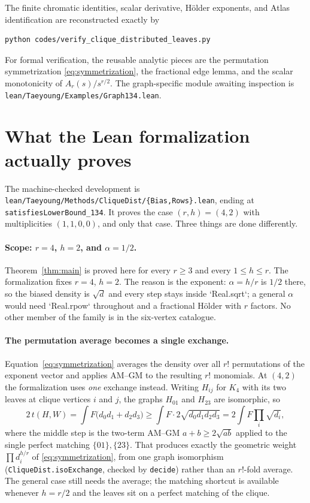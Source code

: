 \documentclass[11pt]{article}
\begin{document}
The finite chromatic identities, scalar derivative, H\"older exponents, and
Atlas identification are reconstructed exactly by
\begin{verbatim}
python codes/verify_clique_distributed_leaves.py
\end{verbatim}
For formal verification, the reusable analytic pieces are the permutation
symmetrization \eqref{eq:symmetrization}, the fractional edge lemma, and the
scalar monotonicity of $A_r(s)/s^{r/2}$.  The graph-specific module awaiting
inspection is
\texttt{lean/Taeyoung/Examples/Graph134.lean}.


\section{What the Lean formalization actually proves}

The machine-checked development is
\texttt{lean/Taeyoung/Methods/CliqueDist/\{Bias,Rows\}.lean}, ending at
\texttt{satisfiesLowerBound\_134}.  It proves the case
$(r,h)=(4,2)$ with multiplicities $(1,1,0,0)$, and only that case.  Three
things are done differently.

\paragraph{Scope: $r=4$, $h=2$, and $\alpha=1/2$.}
Theorem~\ref{thm:main} is proved here for every $r\geq3$ and every
$1\leq h\leq r$.  The formalization fixes $r=4$, $h=2$.  The reason is the
exponent: $\alpha=h/r$ is $1/2$ there, so the biased density is $\sqrt d$ and
every step stays inside `Real.sqrt`; a general $\alpha$ would need
`Real.rpow` throughout and a fractional H\"older with $r$ factors.  No other
member of the family is in the six-vertex catalogue.

\paragraph{The permutation average becomes a single exchange.}
Equation~\eqref{eq:symmetrization} averages the density over all $r!$
permutations of the exponent vector and applies AM--GM to the resulting $r!$
monomials.  At $(4,2)$ the formalization uses \emph{one} exchange instead.
Writing $H_{ij}$ for $K_4$ with its two leaves at clique vertices $i$ and $j$,
the graphs $H_{01}$ and $H_{23}$ are isomorphic, so
\[
 2\,t(H,W)=\int F\bigl(d_0d_1+d_2d_3\bigr)
 \geq\int F\cdot2\sqrt{d_0d_1d_2d_3}
 =2\int F\prod_{i}\sqrt{d_i},
\]
where the middle step is the two-term AM--GM $a+b\geq2\sqrt{ab}$ applied to the
single perfect matching $\{01\},\{23\}$.  That produces exactly the geometric
weight $\prod d_i^{h/r}$ of \eqref{eq:symmetrization}, from one graph
isomorphism (\texttt{CliqueDist.isoExchange}, checked by \texttt{decide}) rather
than an $r!$-fold average.  The general case still needs the average; the
matching shortcut is available whenever $h=r/2$ and the leaves sit on a
perfect matching of the clique.
\end{document}
